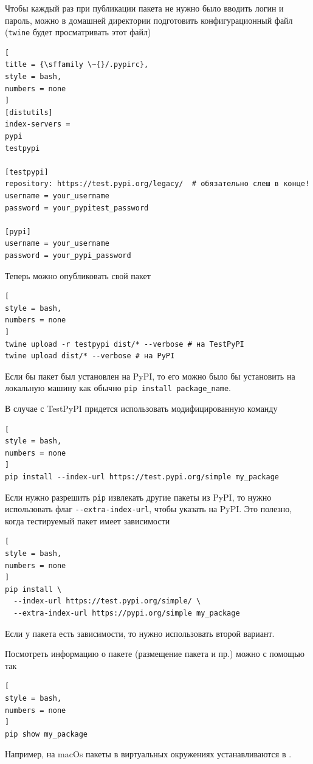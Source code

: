 \documentclass[%
	11pt,
	a4paper,
	utf8,
		]{article}
\begin{document}
Чтобы каждый раз при публикации пакета не нужно было вводить логин и пароль, можно в домашней директории подготовить конфигурационный файл (\texttt{twine} будет просматривать этот файл)
\begin{lstlisting}[
title = {\sffamily \~{}/.pypirc},
style = bash,
numbers = none	
]
[distutils]
index-servers =
pypi
testpypi

[testpypi]
repository: https://test.pypi.org/legacy/  # обязательно слеш в конце!
username = your_username
password = your_pypitest_password

[pypi]
username = your_username
password = your_pypi_password
\end{lstlisting}

Теперь можно опубликовать свой пакет 
\begin{lstlisting}[
style = bash,
numbers = none	
]
twine upload -r testpypi dist/* --verbose # на TestPyPI
twine upload dist/* --verbose # на PyPI
\end{lstlisting}

Если бы пакет был установлен на PyPI, то его можно было бы установить на локальную машину как обычно \texttt{pip install package\_name}.

В случае с TestPyPI придется использовать модифицированную команду
\begin{lstlisting}[
style = bash,
numbers = none	
]
pip install --index-url https://test.pypi.org/simple my_package
\end{lstlisting}


Если нужно разрешить \texttt{pip} извлекать другие пакеты из PyPI, то нужно использовать флаг \verb|--extra-index-url|, чтобы указать на PyPI. Это полезно, когда тестируемый пакет имеет зависимости
\begin{lstlisting}[
style = bash,
numbers = none	
]
pip install \
  --index-url https://test.pypi.org/simple/ \
  --extra-index-url https://pypi.org/simple my_package
\end{lstlisting}

Если у пакета есть зависимости, то нужно использовать второй вариант.

Посмотреть информацию о пакете (размещение пакета и пр.) можно с помощью так
\begin{lstlisting}[
style = bash,
numbers = none	
]
pip show my_package
\end{lstlisting}

Например, на macOs пакеты в виртуальных окружениях устанавливаются в .
\end{document}
